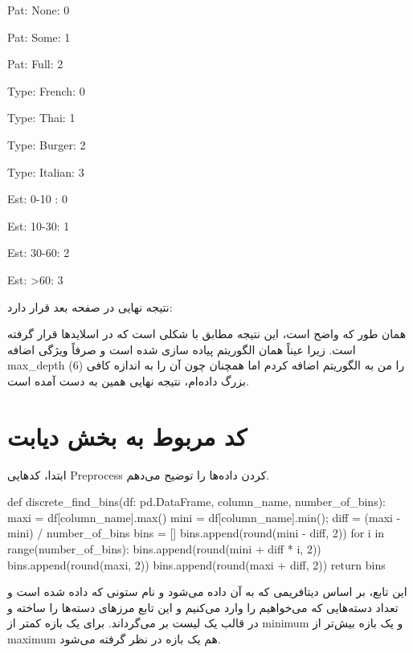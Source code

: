 \documentclass[12pt,titlepage,a4page , tikz , multi,table , svgnames,xcdraw]{article}
\begin{document}
\begin{latin}

Pat: None: 0

Pat: Some: 1

Pat: Full: 2

Type: French: 0

Type: Thai: 1

Type: Burger: 2

Type: Italian: 3

Est: 0-10 : 0

Est: 10-30: 1

Est: 30-60: 2

Est: >60: 3


\end{latin}

نتیجه نهایی در صفحه بعد قرار دارد:



همان طور که واضح است، این نتیجه مطابق با شکلی است که در اسلایدها قرار گرفته است. زیرا عیناً همان الگوریتم پیاده سازی شده است و صرفاً ویژگی اضافه max\_depth را من به الگوریتم اضافه کردم اما همچنان چون آن را به اندازه کافی (6) بزرگ داده‌ام، نتیجه نهایی همین به دست آمده است.

\newpage

\section{کد مربوط به بخش دیابت}

ابتدا، کدهایی Preprocess کردن داده‌ها را توضیح می‌دهم.


   \begin{latin}
\begin{python}[language=Python]

def discrete_find_bins(df: pd.DataFrame, column_name, number_of_bins):
    maxi = df[column_name].max()
    mini = df[column_name].min();
    diff = (maxi - mini) / number_of_bins
    bins = []
    bins.append(round(mini - diff, 2))
    for i in range(number_of_bins):
        bins.append(round(mini + diff * i, 2))
    bins.append(round(maxi, 2))
    bins.append(round(maxi + diff, 2))
    return bins
\end{python}

\end{latin}

این تابع، بر اساس دیتافریمی که به آن داده می‌شود و نام ستونی که داده شده است و تعداد دسته‌هایی که می‌خواهیم را وارد می‌کنیم و این تابع مرزهای دسته‌ها را ساخته و در قالب یک لیست بر می‌گرداند. برای یک بازه کمتر از minimum و یک بازه بیش‌تر از maximum هم یک بازه در نظر گرفته می‌شود.
\end{document}
